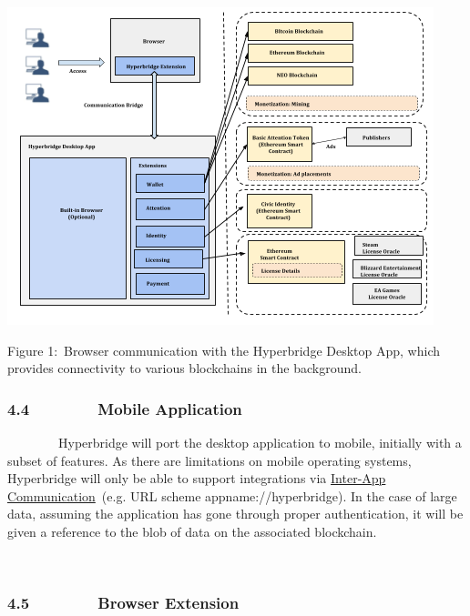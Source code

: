 \documentclass[]{article}
\begin{document}
{\includegraphics{images/image3.png}}

{Figure 1:}{~Browser communication with the Hyperbridge Desktop App,
which provides connectivity to various blockchains in the background.}

{}

{}

{}

\hypertarget{h.usp0cwy1jwzu}{%
\subsubsection{\texorpdfstring{{4.4~~~~~~~~Mobile
Application}}{4.4~~~~~~~~Mobile Application}}\label{h.usp0cwy1jwzu}}

{~~~~~~~~Hyperbridge will port the desktop application to mobile,
initially with a subset of features. As there are limitations on mobile
operating systems, Hyperbridge will only be able to support integrations
via
}{\href{https://www.google.com/url?q=https://developer.apple.com/library/content/documentation/iPhone/Conceptual/iPhoneOSProgrammingGuide/Inter-AppCommunication/Inter-AppCommunication.html\&sa=D\&ust=1512628005810000\&usg=AFQjCNE-nWpJbwxQ9kUoqn5uBdIuw6lc2A}{Inter-App
Communication}}{~(e.g. URL scheme appname://hyperbridge). In the case of
large data, assuming the application has gone through proper
authentication, it will be given a reference to the blob of data on the
associated blockchain.}

{~~~~~~~~}

\hypertarget{h.d354z2kuj099}{%
\subsubsection{\texorpdfstring{{4.5~~~~~~~~Browser
Extension}}{4.5~~~~~~~~Browser Extension}}\label{h.d354z2kuj099}}
\end{document}
